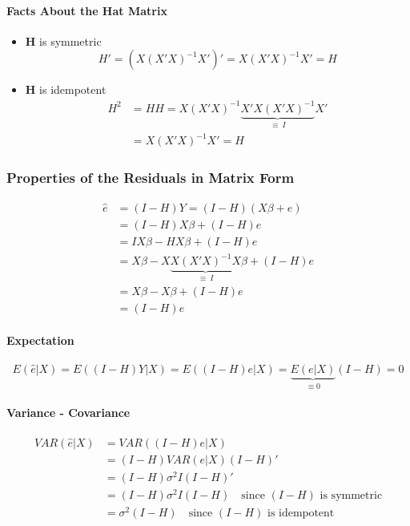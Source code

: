 \documentclass[10pt]{article}
\begin{document}
\paragraph{Facts About the Hat Matrix}
\begin{itemize}
    \item $\mathbf{H}$ is symmetric
        \begin{equation*}
            H' = (X(X'X)^{-1}X')' = X(X'X)^{-1}X' = H
        \end{equation*}
    \item $\mathbf{H}$ is idempotent
        \begin{align*}
            H^2 &= HH =  X(X'X)^{-1} \underbrace{X' X(X'X)^{-1}}_{\equiv ~I}X' \\
            &=  X(X'X)^{-1}X' = H
        \end{align*}
\end{itemize}

\subsubsection{Properties of the Residuals in Matrix Form}
\begin{align*}
    \hat{e} &= (I - H)Y = (I - H)(X\beta + e) \\
    &= (I - H)X\beta + (I - H)e \\
    &= IX\beta - HX\beta + (I - H)e \\
    &= X\beta - X\underbrace{X(X'X)^{-1}X}_{\equiv ~I} \beta + (I - H)e \\
    &= X\beta - X\beta + (I - H)e \\
    &= (I - H)e
\end{align*}
\paragraph{Expectation}
\begin{equation*}
    E(\hat{e}| X) = E((I - H)Y | X) = E((I - H)e | X) = \underbrace{E(e|X)}_{\equiv 0}(I - H) = 0
\end{equation*}

\paragraph{Variance - Covariance}
\begin{align*}
    VAR(\hat{e}|X) &= VAR((I-H)e|X) \\
    &= (I - H) VAR(e|X) (I - H)' \\
    &= (I - H) \sigma^2 I (I - H) '\\
    &= (I - H) \sigma^2 I (I - H) \quad \text{since $(I - H)$ is symmetric} \\
    &= \sigma^2 (I - H) \quad \text{since $(I - H)$ is idempotent}
\end{align*}
\end{document}
